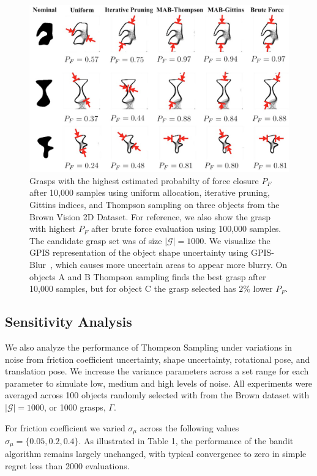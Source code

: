 \documentclass[10pt, conference]{ieeeconf}      %
\newcommand{\mG}{\mathcal{G}}
\begin{document}
\begin{figure}%
\label{fig:shape_examples}
    \centering
    \includegraphics[width=16.5cm]{figures/shapes.jpg}%
    \caption{Grasps with the highest estimated probabilty of force closure $P_F$ after 10,000 samples using uniform allocation, iterative pruning, Gittins indices, and Thompson sampling on three objects from the Brown Vision 2D Dataset. For reference, we also show the grasp with highest $P_F$ after brute force evaluation using 100,000 samples. The candidate grasp set was of size $|\mG|=1000$. We visualize the GPIS representation of the object shape uncertainty using GPIS-Blur~\cite{mahler2015gp}, which causes more uncertain areas to appear more blurry.  On objects A and B Thompson sampling finds the best grasp after 10,000 samples, but for object C the grasp selected has $2\%$ lower $P_F$.}%
    \label{fig:shape_samples}%
\end{figure}


\subsection{Sensitivity Analysis }\label{sec:sensitivity}
We also analyze the performance of Thompson Sampling under variations in noise from friction coefficient uncertainty, shape uncertainty, rotational pose, and translation pose.
We increase the variance parameters across a set range for each parameter to simulate low, medium and high levels of noise.
All experiments were averaged across 100 objects randomly selected with from the Brown dataset with $|\mG| = 1000$, or 1000 grasps, $\Gamma$. 

For friction coefficient we varied $\sigma_{\mu}$ across the following values $\sigma_{\mu} = \lbrace 0.05, 0.2, 0.4 \rbrace$.
As illustrated in Table 1, the performance of the bandit algorithm remains largely unchanged, with typical convergence to zero in simple regret less than 2000 evaluations.
\end{document}
